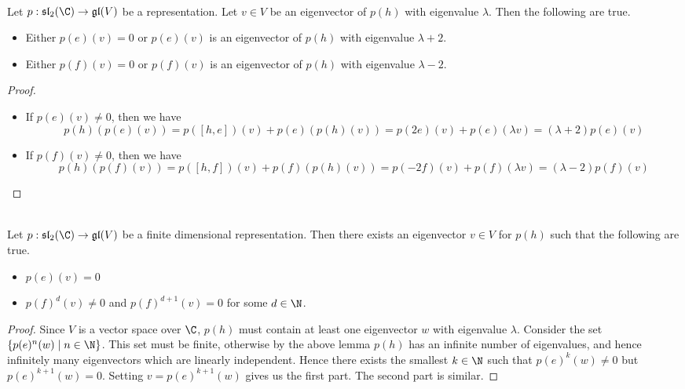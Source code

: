 \documentclass[a4paper]{article}
\begin{document}
\begin{lmm}{}{} \\Let $p:\mathfrak{sl}_2(\C)\to\mathfrak{gl}(V)$ be a representation. Let $v\in V$ be an eigenvector of $p(h)$ with eigenvalue $\lambda$. Then the following are true. 
\begin{itemize}
\item Either $p(e)(v)=0$ or $p(e)(v)$ is an eigenvector of $p(h)$ with eigenvalue $\lambda+2$. 
\item Either $p(f)(v)=0$ or $p(f)(v)$ is an eigenvector of $p(h)$ with eigenvalue $\lambda-2$. 
\end{itemize} 
\begin{proof}~
\begin{itemize}
\item If $p(e)(v)\neq 0$, then we have $$p(h)(p(e)(v))=p([h,e])(v)+p(e)(p(h)(v))=p(2e)(v)+p(e)(\lambda v)=(\lambda+2)p(e)(v)$$
\item If $p(f)(v)\neq 0$, then we have $$p(h)(p(f)(v))=p([h,f])(v)+p(f)(p(h)(v))=p(-2f)(v)+p(f)(\lambda v)=(\lambda-2)p(f)(v)$$
\end{itemize}
\end{proof}
\end{lmm}

\begin{lmm}{}{} \\Let $p:\mathfrak{sl}_2(\C)\to\mathfrak{gl}(V)$ be a finite dimensional representation. Then there exists an eigenvector $v\in V$ for $p(h)$ such that the following are true. 
\begin{itemize}
\item $p(e)(v)=0$
\item $p(f)^d(v)\neq 0$ and $p(f)^{d+1}(v)=0$ for some $d\in\N$. 
\end{itemize} 
\begin{proof}
Since $V$ is a vector space over $\C$, $p(h)$ must contain at least one eigenvector $w$ with eigenvalue $\lambda$. Consider the set $\{p(e)^n(w)\;|\;n\in\N\}$. This set must be finite, otherwise by the above lemma $p(h)$ has an infinite number of eigenvalues, and hence infinitely many eigenvectors which are linearly independent. Hence there exists the smallest $k\in\N$ such that $p(e)^k(w)\neq 0$ but $p(e)^{k+1}(w)=0$. Setting $v=p(e)^{k+1}(w)$ gives us the first part. The second part is similar. 
\end{proof}
\end{lmm}
\end{document}
